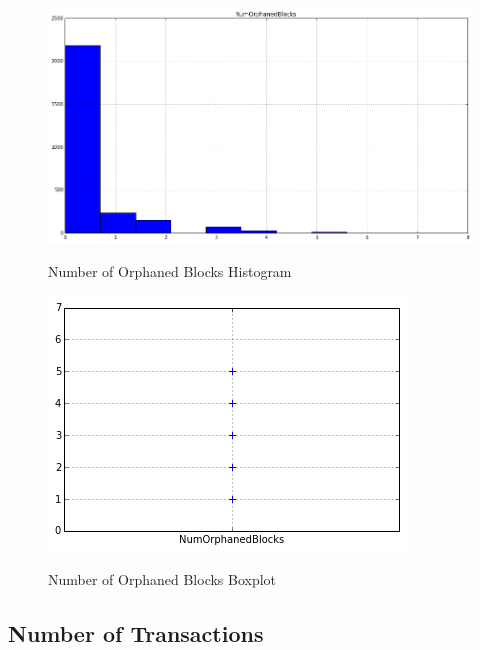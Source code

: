 \begin{figure}[bth]
  \myfloatalign
  {\includegraphics[width=1\linewidth]
    {gfx/n-orphaned-blocks-histogram}}
  \caption{Number of Orphaned Blocks Histogram}
  \label{fig:n-orphaned-blocks-histogram}
\end{figure}

\begin{figure}[bth]
  \myfloatalign
  {\includegraphics[width=1\linewidth]
    {gfx/n-orphaned-blocks-boxplot}}
  \caption{Number of Orphaned Blocks Boxplot}
  \label{fig:n-orphaned-blocks-boxplot}
\end{figure}

\clearpage

\subsection{Number of Transactions}
\label{sec:n-transactions}

